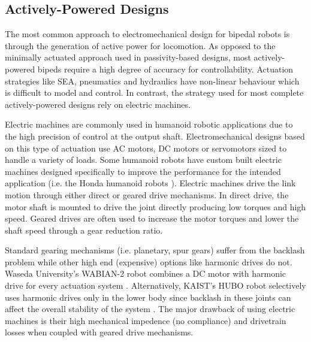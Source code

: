 

\subsection{Actively-Powered Designs} %
\label{sub:related_active_designs}
The most common approach to electromechanical design for bipedal robots is through the generation of active power for locomotion. As opposed to the minimally actuated approach used in passivity-based designs, most actively-powered bipeds require a high degree of accuracy for controllability. Actuation strategies like SEA, pneumatics and hydraulics have non-linear behaviour which is difficult to model and control. In contrast, the strategy used for most complete actively-powered designs rely on electric machines. 

Electric machines are commonly used in humanoid robotic applications due to the high precision of control at the output shaft. Electromechanical designs based on this type of actuation use AC motors, DC motors or servomotors sized to handle a variety of loads. Some humanoid robots have custom built electric machines designed specifically to improve the performance for the intended application (i.e. the Honda humanoid robots \cite{Sakagami:2002cf,Hirai1998}). Electric machines drive the link motion through either direct or geared drive mechanisms. In direct drive, the motor shaft is mounted to drive the joint directly producing low torques and high speed. Geared drives are often used to increase the motor torques and lower the shaft speed through a gear reduction ratio.

Standard gearing mechanisms (i.e. planetary, spur gears) suffer from the backlash problem while other high end (expensive) options like harmonic drives do not. Waseda University's WABIAN-2 robot combines a DC motor with harmonic drive for every actuation system \cite{Ogura:2006bm}. Alternatively, KAIST's HUBO robot selectively uses harmonic drives only in the lower body since backlash in these joints can affect the overall stability of the system \cite{IllWooPark:2005et}. The major drawback of using electric machines is their high mechanical impedence (no compliance) and drivetrain losses when coupled with geared drive mechanisms.  





